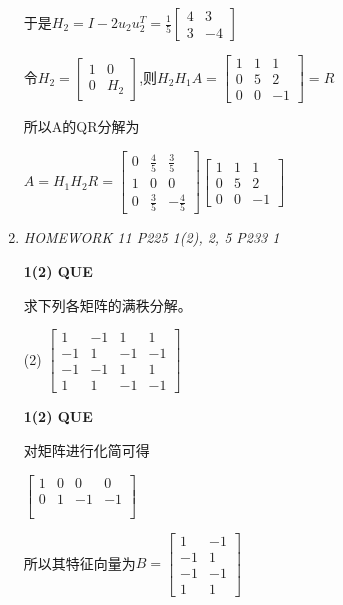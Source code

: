 \documentclass[11pt,letterpaper]{ctexart}
\begin{document}
\begin{enumerate}
于是$H_2 = I - 2u_2u_2^T = \frac{1}{5}\begin{bmatrix}
	4 & 3 \\
	3 & -4
\end{bmatrix}$

令$H_2 = \begin{bmatrix}
	1 & 0 \\
	0 & H_2
\end{bmatrix}$,则$H_2H_1A = \begin{bmatrix}
	 1 & 1 & 1 \\
	 0 & 5 & 2 \\
	 0 & 0 & -1
\end{bmatrix} = R$

所以A的QR分解为

$A = H_1H_2R = \begin{bmatrix}
	0 & \frac{4}{5} &\frac{3}{5} \\
	1 & 0 & 0 \\
	0 & \frac{3}{5} & -\frac{4}{5}
\end{bmatrix} \begin{bmatrix}
	1 & 1 & 1 \\
	0 & 5 & 2 \\
	0 & 0 & -1
\end{bmatrix}$


\item \textit{HOMEWORK 11 {P225 1(2), 2, 5 P233 1}}%

\textbf{1(2) QUE}
\bigskip

求下列各矩阵的满秩分解。

(2) $ \begin{bmatrix}
	1 & -1 & 1 & 1 \\
	-1 & 1 & -1 & -1 \\
	-1 & -1 & 1 & 1 \\
	1 & 1 & -1 & -1 
\end{bmatrix}$


\textbf{1(2) QUE}
\bigskip

对矩阵进行化简可得 

$\begin{bmatrix}
	1 & 0 & 0 & 0 \\
	0 & 1 & -1 & -1 \\
	& & & \\
	& & & 
\end{bmatrix}$

所以其特征向量为$B = \begin{bmatrix}
	1 & -1 \\
	-1 & 1 \\
	-1 & -1 \\
	1 & 1
\end{bmatrix}$


\end{enumerate}
\end{document}
